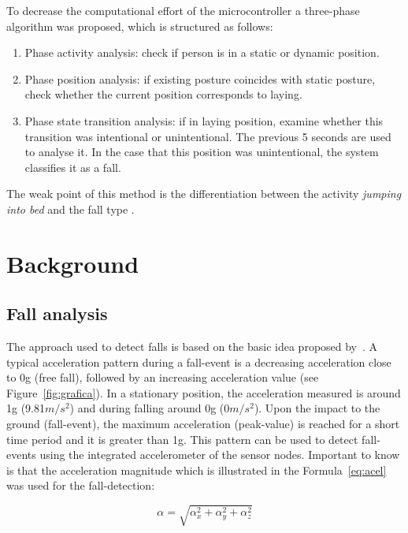 \documentclass[journal]{IEEEtran}
\begin{document}
To decrease the computational effort of the microcontroller a three-phase algorithm was proposed, which is structured 
as follows:

\begin{enumerate}
 \item Phase activity analysis: check if person is in a static or dynamic position.
 \item Phase position analysis: if existing posture coincides with static posture, check whether the current position corresponds to laying.
 \item Phase state transition analysis: if in laying position, examine whether this transition was intentional or unintentional. The previous 5 
 seconds are used to analyse it. In the case that this position was unintentional, the system classifies it as a fall. 
\end{enumerate}

The weak point of this method is the differentiation between the activity \textit{jumping into bed} and the fall type .

\section{Background}
\label{sec:background}

\subsection{Fall analysis}
\label{subsec:analysis}

The approach used to detect falls is based on the basic idea proposed by~\cite{Gjoreski2014,Kozina}. A typical acceleration pattern during 
a fall-event is a decreasing acceleration close to 0g (free fall), followed by an increasing acceleration value (see Figure~\ref{fig:grafica}). In a stationary position, 
the acceleration measured is around 1g (9.81$m/s^{2}$) and during falling around 0g (0$m/s^{2}$). Upon the impact to the ground (fall-event), 
the maximum acceleration (peak-value) is reached for a short time period and it is greater than 1g. This pattern can be used to 
detect fall-events using the integrated accelerometer of the sensor nodes. Important to know is that the acceleration 
magnitude which is illustrated in the Formula~\ref{eq:acel} was used for the fall-detection:

\begin{equation}\label{eq:acel}
 \alpha = \sqrt{\alpha_{x}^{2} + \alpha_{y}^{2} + \alpha_{z}^{2}}
\end{equation}
\end{document}
